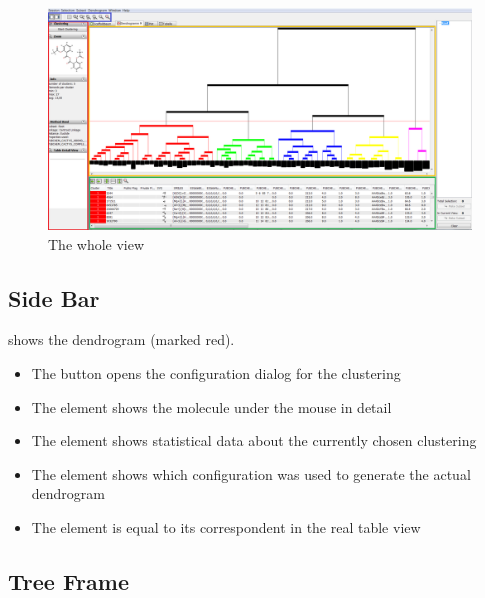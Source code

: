  \begin{figure}[!htb]
\centering
\includegraphics[width=1\textwidth]{images/dendrogram/overview_with_marks}
\caption{The whole view}
\label{fig:dendrogram_regions}
\end{figure} 

\subsection{Side Bar}

 shows the dendrogram \sbar (marked red). 
\begin{itemize}
\item The  button opens the configuration dialog for the clustering
\item The  element shows the molecule under the mouse in detail
\item The  element shows statistical data about the currently chosen clustering
\item The  element shows which configuration was used to generate the actual dendrogram
\item The  element is equal to its correspondent in the real table view
\end{itemize}



\subsection{Tree Frame} 




